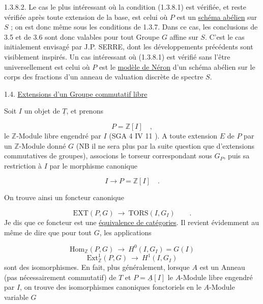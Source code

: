 1.3.8.2.  Le cas le plus intéressant où la condition (1.3.8.1) est vérifiée, et reste vérifiée après toute extension de la base, est celui où $P$ est un \underline{schéma abélien} sur $S$ ; on est donc même sous les conditions de 1.3.7. Dans ce cas, les conclusions de 3.5 et de 3.6 sont donc valables pour tout Groupe $G$ affine sur $S$. C'est le cas initialement envisagé par J.P. SERRE, dont les développements précédents sont visiblement inspirés. Un cas intéressant où (1.3.8.1) est vérifié sans l'être universellement est celui où $P$ est le \underline{modèle de Néron} d'un schéma abélien sur le corps des fractions d'un anneau de valuation discrète de spectre $S$.


1.4.  \underline{Extensions d'un Groupe commutatif libre}

Soit $I$ un objet de $\underline{T}$, et prenons

\begin{equation}\tag{1.4.1}
P = \mathbb{Z}[I] \quad ,
\end{equation}
le $\mathbb{Z}$-Module libre engendré par $I$ (SGA 4 IV 11 ). A toute extension $E$ de $P$ par un $\mathbb{Z}$-Module donné $G$ (NB il ne sera plus par la suite question que d'extensions commutatives de groupes), associons le torseur correspondant sous $G_P$, puis sa restriction à $I$ par le morphisme canonique

\begin{equation*}
I \longrightarrow P = \mathbb{Z}[I] \quad .
\end{equation*}


On trouve ainsi un foncteur canonique

\begin{equation}\tag{1.4.2}
\mathrm{EXT}(P,G) \ \longrightarrow\ \mathrm{TORS}(I,G_I) \qquad .
\end{equation}
Je dis que ce foncteur est une \underline{équivalence de catégories}. Il revient évidemment au même de dire que pour tout $G$, les applications

\begin{equation}\tag{1.4.3}
\mathrm{Hom}_{\mathbb{Z}}(P,G) \ \longrightarrow\ H^0(I,G_I) = G(I)
\end{equation}
\begin{equation}\tag{1.4.4}
\mathrm{Ext}^1_{\mathbb{Z}}(P,G) \ \longrightarrow\ H^1(I,G_I)
\end{equation}
sont des isomorphismes. En fait, plus généralement, lorsque $A$ est un Anneau (pas nécessairement commutatif) de \underline{$T$} et $P = \underline{A}[I]$ le $A$-Module libre engendré par $I$, on trouve des isomorphismes canoniques fonctoriels en le $A$-Module variable $G$

